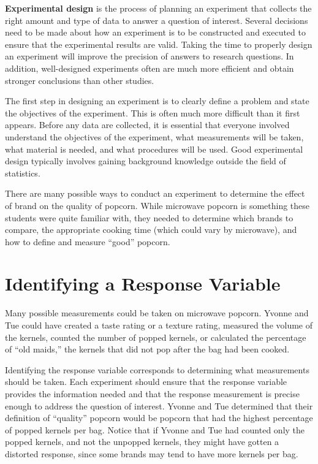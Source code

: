 \documentclass[
]{report}
\begin{document}
\textbf{Experimental design} is the process of planning an experiment that collects the right amount and type of data to answer a question of interest. Several decisions need to be made about how an experiment is to be constructed and executed to ensure that the experimental results are valid. Taking the time to properly design an experiment will improve the precision of answers to research questions. In addition, well-designed experiments often are much more efficient and obtain stronger conclusions than other studies.

The first step in designing an experiment is to clearly define a problem and state the objectives of the experiment. This is often much more difficult than it first appears. Before any data are collected, it is essential that everyone involved understand the objectives of the experiment, what measurements will be taken, what material is needed, and what procedures will be used. Good experimental design typically involves gaining background knowledge outside the field of statistics.

There are many possible ways to conduct an experiment to determine the effect of brand on the quality of popcorn. While microwave popcorn is something these students were quite familiar with, they needed to determine which brands to compare, the appropriate cooking time (which could vary by microwave), and how to define and measure ``good'' popcorn.

\section*{Identifying a Response Variable}\label{identifying-a-response-variable}

Many possible measurements could be taken on microwave popcorn. Yvonne and Tue could have created a taste rating or a texture rating, measured the volume of the kernels, counted the number of popped kernels, or calculated the percentage of ``old maids,'' the kernels that did not pop after the bag had been cooked.

Identifying the response variable corresponds to determining what measurements should be taken. Each experiment should ensure that the response variable provides the information needed and that the response measurement is precise enough to address the question of interest. Yvonne and Tue determined that their definition of ``quality'' popcorn would be popcorn that had the highest percentage of popped kernels per bag. Notice that if Yvonne and Tue had counted only the popped kernels, and not the unpopped kernels, they might have gotten a distorted response, since some brands may tend to have more kernels per bag.
\end{document}
